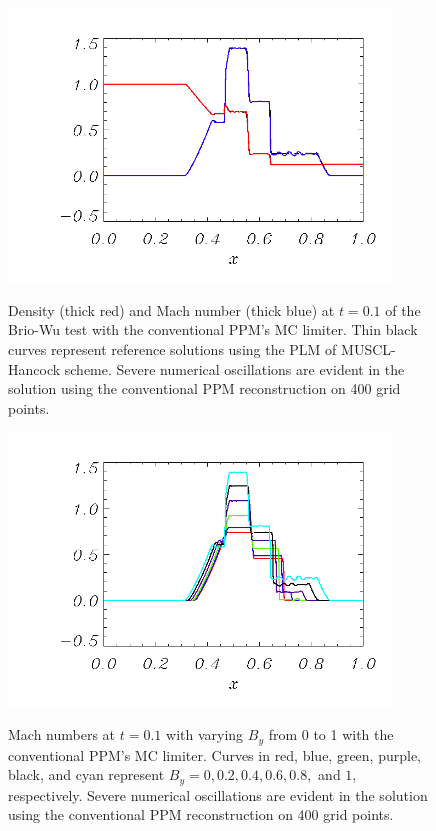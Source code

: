 \begin{figure}[!htbp]
\begin{center}
{\leavevmode\includegraphics[width=4in]{Lee_fig7}}
\end{center}
\caption{\label{fig:BrioWu_standardPPM_a} Density (thick red) and Mach number (thick blue) at $t=0.1$ of the Brio-Wu test with the conventional PPM's MC limiter. Thin black curves represent
reference solutions using the PLM of MUSCL-Hancock scheme. Severe numerical oscillations are evident in the solution using the conventional PPM reconstruction on 400 grid points.
}
\end{figure}

\begin{figure}[!htbp]
\begin{center}
{\leavevmode\includegraphics[width=4in]{Lee_fig8}}
\end{center}
\caption{\label{fig:BrioWu_standardPPM_b} Mach numbers at $t=0.1$ with varying $B_y$ from 0 to 1 with the conventional PPM's MC limiter. Curves in red, blue, green, purple, black, and cyan
represent $B_y=0, 0.2, 0.4, 0.6, 0.8,$ and $1$, respectively. Severe numerical oscillations are evident in the solution using the conventional PPM reconstruction on 400 grid points.
}
\end{figure}

